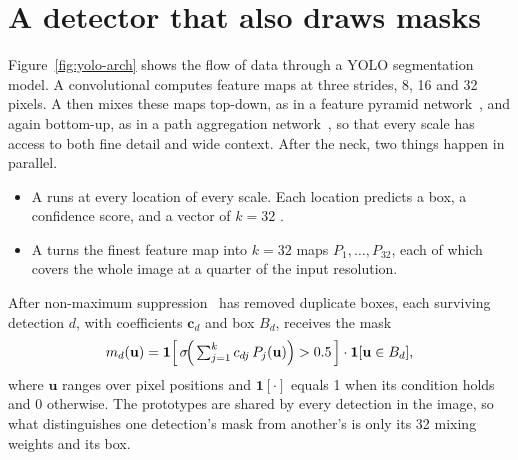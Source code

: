 \section{A detector that also draws masks}\label{sec:yolo-arch}
Figure~\ref{fig:yolo-arch} shows the flow of data through a YOLO segmentation model. A convolutional
 computes feature maps at three strides, 8, 16 and 32 pixels. A 
then mixes these maps top-down, as in a feature pyramid network~\citep{lin2017fpn}, and again
bottom-up, as in a path aggregation network~\citep{liu2018panet}, so that every scale has access to
both fine detail and wide context. After the neck, two things happen in
parallel.
\begin{itemize}[leftmargin=*,itemsep=2pt]
\item A  runs at every location of every scale. Each location predicts a
box, a confidence score, and a vector of $k=32$ .
\item A  turns the finest feature map into $k=32$  maps
$P_1,\dots,P_{32}$, each of which covers the whole image at a quarter of the input resolution.
\end{itemize}
After non-maximum suppression~\citep{neubeck2006} has removed duplicate boxes, each surviving detection $d$, with
coefficients $\mathbf{c}_d$ and box $B_d$, receives the mask
\begin{equation}
m_d(\mathbf{u}) = \mathbf{1}\!\left[\,\sigma\!\Big(\textstyle\sum_{j=1}^{k} c_{dj}\,P_j(\mathbf{u})\Big) > 0.5\,\right]
\cdot \mathbf{1}[\mathbf{u}\in B_d],
\label{eq:yolo-mask}
\end{equation}
where $\mathbf{u}$ ranges over pixel positions and $\mathbf{1}[\cdot]$ equals 1 when its condition
holds and 0 otherwise. The prototypes are shared by every detection in the image, so what
distinguishes one detection's mask from another's is only its 32 mixing weights and its box.

